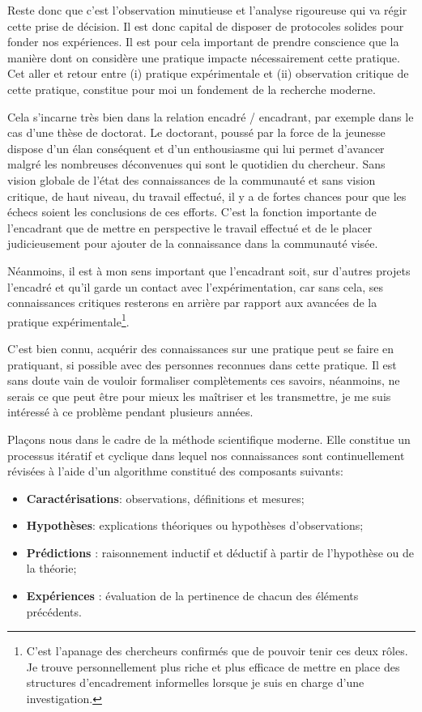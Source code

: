Reste donc que c'est l'observation minutieuse et l'analyse rigoureuse qui va régir cette prise de décision. Il est donc capital de disposer de protocoles solides pour fonder nos expériences. Il est pour cela important de prendre conscience que la manière dont on considère une pratique impacte nécessairement cette pratique. Cet aller et retour entre (i) pratique expérimentale et (ii) observation critique de cette pratique, constitue pour moi un fondement de la recherche moderne.

Cela s'incarne très bien dans la relation encadré / encadrant, par exemple dans le cas d'une thèse de doctorat. Le doctorant, poussé par la force de la jeunesse dispose d'un élan conséquent et d'un enthousiasme qui lui permet d'avancer malgré les nombreuses déconvenues qui sont le quotidien du chercheur. Sans vision globale de l'état des connaissances de la communauté et sans vision critique, de haut niveau, du travail effectué, il y a de fortes chances pour que les échecs soient les conclusions de ces efforts. C'est la fonction importante de l'encadrant que de mettre en perspective le travail effectué et de le placer judicieusement pour ajouter de la connaissance dans la communauté visée.

Néanmoins, il est à mon sens important que l'encadrant soit, sur d'autres projets l'encadré et qu'il garde un contact avec l'expérimentation, car sans cela, ses connaissances critiques resterons en arrière par rapport aux avancées de la pratique expérimentale\footnote{C'est l'apanage des chercheurs confirmés que de pouvoir tenir ces deux rôles. Je trouve personnellement plus riche et plus efficace de mettre en place des structures d'encadrement informelles lorsque je suis en charge d'une investigation.}.

C'est bien connu, acquérir des connaissances sur une pratique peut se faire en pratiquant, si possible avec des personnes reconnues dans cette pratique. Il est sans doute vain de vouloir formaliser complètements ces savoirs, néanmoins, ne serais ce que peut être pour mieux les maîtriser et les transmettre, je me suis intéressé à ce problème pendant plusieurs années.

Plaçons nous dans le cadre de la méthode scientifique moderne. Elle constitue un processus itératif et cyclique dans lequel nos connaissances sont continuellement révisées à l'aide d'un algorithme constitué des composants suivants:
\begin{itemize}
  \item \textbf{Caractérisations}: observations, définitions et mesures;
  \item \textbf{Hypothèses}: explications théoriques ou hypothèses d'observations;
  \item \textbf{Prédictions} : raisonnement inductif et déductif à partir de l'hypothèse ou de la théorie;
  \item \textbf{Expériences} : évaluation de la pertinence de chacun des éléments précédents.
\end{itemize}

